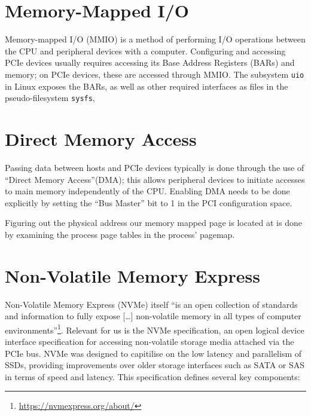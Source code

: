 \section{Memory-Mapped I/O}
Memory-mapped I/O (MMIO) is a method of performing I/O operations between the CPU and peripheral devices with a computer. Configuring and accessing PCIe devices usually requires accessing its Base Address Registers (BARs) and memory; on PCIe devices, these are accessed through MMIO. The subsystem \texttt{uio} in Linux exposes the BARs, as well as other required interfaces as files in the pseudo-filesystem \texttt{sysfs},

\section{Direct Memory Access}
Passing data between hosts and PCIe devices typically is done through the use of ``Direct Memory Access''(DMA); this allows peripheral devices to initiate accesses to main memory independently of the CPU. Enabling DMA needs to be done explicitly by setting the ``Bus Master'' bit to 1 in the PCI configuration space.


Figuring out the physical address our memory mapped page is located at is done by examining the process page tables in the process' pagemap.


\section{Non-Volatile Memory Express}
Non-Volatile Memory Express (NVMe) itself ``is an open collection of standards and information to fully expose [\ldots] non-volatile memory in all types of computer environments''\footnote{\url{https://nvmexpress.org/about/}}. Relevant for us is the NVMe specification, an open logical device interface specification for accessing non-volatile storage media attached via the PCIe bus. NVMe was designed to capitilise on the low latency and parallelism of SSDs, providing improvements over older storage interfaces such as SATA or SAS in terms of speed and latency. This specification defines several key components:

